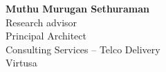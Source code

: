 \vspace{-\parskip}
\begingroup
\singlespacing
\begin{flushright}
\textbf{Muthu Murugan Sethuraman}    \\
Research advisor        \\
Principal Architect \\
Consulting Services – Telco Delivery \\
Virtusa              \\

\par
\vspace{3\parskip}

\end{flushright}
\endgroup
\par
